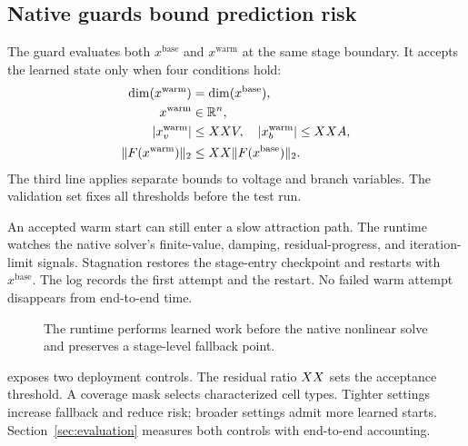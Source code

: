 \subsection{Native guards bound prediction risk}

The guard evaluates both $x^{\mathrm{base}}$ and $x^{\mathrm{warm}}$ at the same stage boundary. It accepts the learned state only when four conditions hold:
\begin{align}
\dim(x^{\mathrm{warm}})&=\dim(x^{\mathrm{base}}), \\
x^{\mathrm{warm}}&\in\mathbb{R}^{n}, \\
|x^{\mathrm{warm}}_v|&\le XX V,\quad
|x^{\mathrm{warm}}_b|\le XX A, \\
\|F(x^{\mathrm{warm}})\|_2&\le XX\|F(x^{\mathrm{base}})\|_2.
\label{eq:guard}
\end{align}
The third line applies separate bounds to voltage and branch variables. The validation set fixes all thresholds before the test run.

An accepted warm start can still enter a slow attraction path. The runtime watches the native solver's finite-value, damping, residual-progress, and iteration-limit signals. Stagnation restores the stage-entry checkpoint and restarts with $x^{\mathrm{base}}$. The log records the first attempt and the restart. No failed warm attempt disappears from end-to-end time.

\begin{figure}[t]
\small
\setlength{\fboxsep}{5pt}
\caption{The runtime performs learned work before the native nonlinear solve and preserves a stage-level fallback point.}
\label{alg:cellwarm}
\end{figure}

\system{} exposes two deployment controls. The residual ratio $XX$ sets the acceptance threshold. A coverage mask selects characterized cell types. Tighter settings increase fallback and reduce risk; broader settings admit more learned starts. Section~\ref{sec:evaluation} measures both controls with end-to-end accounting.

